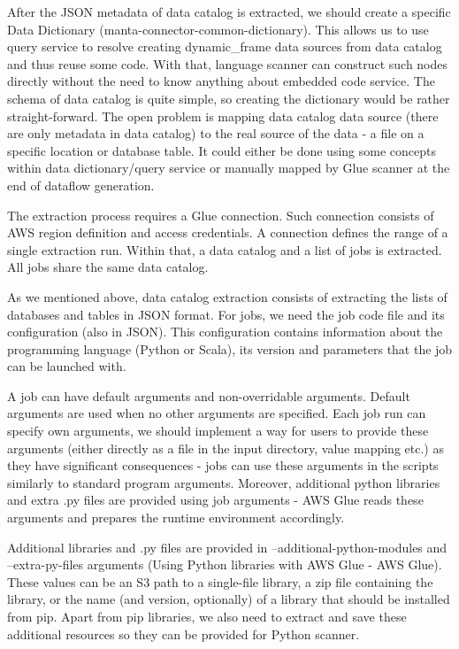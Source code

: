 After the JSON metadata of data catalog is extracted, we should create a specific Data Dictionary (manta-connector-common-dictionary). This allows us to use query service to resolve creating dynamic\_frame data sources from data catalog and thus reuse some code. With that, language scanner can construct such nodes directly without the need to know anything about embedded code service. The schema of data catalog is quite simple, so creating  the dictionary would be rather straight-forward. The open problem is mapping data catalog data source (there are only metadata in data catalog) to the real source of the data - a file on a specific location or database table. It could either be done using some concepts within data dictionary/query service or manually mapped by Glue scanner at the end of dataflow generation. 

The extraction process requires a Glue connection. Such connection consists of AWS region definition and access credentials. A connection defines the range of a single extraction run. Within that, a data catalog and a list of jobs is extracted. All jobs share the same data catalog.

As we mentioned above, data catalog extraction consists of extracting the lists of databases and tables in JSON format. For jobs, we need the job code file and its configuration (also in JSON). This configuration contains information about the programming language (Python or Scala), its version and parameters that the job can be launched with. 

A job can have default arguments and non-overridable arguments. Default arguments are used when no other arguments are specified. Each job run can specify own arguments, we should implement a way for users to provide these arguments (either directly as a file in the input directory, value mapping etc.) as they have significant consequences - jobs can use these arguments in the scripts similarly to standard program arguments. Moreover, additional python libraries and extra .py files are provided using job arguments - AWS Glue reads these arguments and prepares the runtime environment accordingly. 

Additional libraries and .py files are provided in --additional-python-modules and --extra-py-files arguments (Using Python libraries with AWS Glue - AWS Glue). These values can be an S3 path to a single-file library, a zip file containing the library, or the name (and version, optionally) of a library that should be installed from pip. Apart from pip libraries, we also need to extract and save these additional resources so they can be provided for Python scanner.

